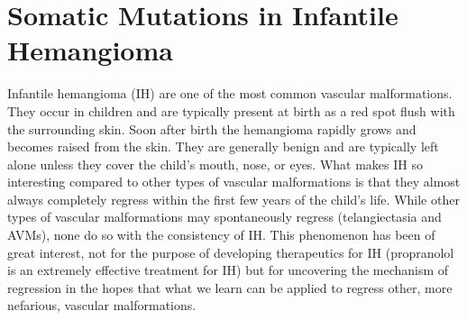 







\section{Somatic Mutations in Infantile Hemangioma}
Infantile hemangioma (IH) are one of the most common vascular malformations. They occur in children and are typically present at birth as a red spot flush with the surrounding skin. Soon after birth the hemangioma rapidly grows and becomes raised from the skin. They are generally benign and are typically left alone unless they cover the child's mouth, nose, or eyes. What makes IH so interesting compared to other types of vascular malformations is that they almost always completely regress within the first few years of the child's life. While other types of vascular malformations may spontaneously regress (telangiectasia and AVMs), none do so with the consistency of IH. This phenomenon has been of great interest, not for the purpose of developing therapeutics for IH (propranolol is an extremely effective treatment for IH) but for uncovering the mechanism of regression in the hopes that what we learn can be applied to regress other, more nefarious, vascular malformations. 

